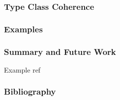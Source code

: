 \documentclass{beamer}
\begin{document}
\begin{frame}
    \frametitle{Type Class Coherence}
\end{frame}

\begin{frame}
    \frametitle{Examples}
\end{frame}

\begin{frame}
    \frametitle{Summary and Future Work}

    Example ref
    \cite{kiselyov}
\end{frame}

\begin{frame}
    \frametitle{Bibliography}
    
    
\end{frame}
\end{document}

